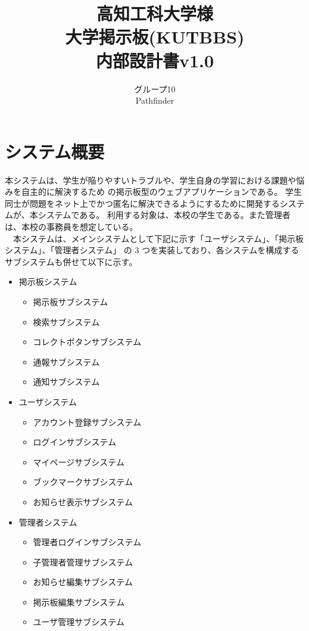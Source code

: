 \documentclass[a4j]{jarticle}
\title{
\vspace{30mm}
{\bf 高知工科大学様}\\
\vspace{5mm}
大学掲示板(KUTBBS)\\
\vspace{5mm}
{\bf  内部設計書v1.0}
\vspace{90mm}
}
\author{
\vspace{5mm}
グループ10 \\
\vspace{5mm}
Pathfinder \\
\vspace{5mm}
\vspace{10mm}
}
\begin{document}
\maketitle
\newpage
\tableofcontents
\newpage


 \section{システム概要}
本システムは、学生が陥りやすいトラブルや、学生自身の学習における課題や悩みを自主的に解決するため の掲示板型のウェブアプリケーションである。 学生同士が問題をネット上でかつ匿名に解決できるようにするために開発するシステムが、本システムである。 利用する対象は、本校の学生である。また管理者は、本校の事務員を想定している。\\
　本システムは、メインシステムとして下記に示す「ユーザシステム」、「掲示板システム」、「管理者システム」 の 3 つを実装しており、各システムを構成するサブシステムも併せて以下に示す。
\begin{itemize}
\item 掲示板システム
	\begin{itemize}
	\item 掲示板サブシステム
	\item 検索サブシステム
	\item コレクトボタンサブシステム
	\item 通報サブシステム
	\item 通知サブシステム
	\end{itemize}
\item ユーザシステム
	\begin{itemize}
	\item アカウント登録サブシステム
	\item ログインサブシステム
	\item マイページサブシステム
	\item ブックマークサブシステム
	\item お知らせ表示サブシステム
	\end{itemize}
\item 管理者システム
	\begin{itemize}
	\item 管理者ログインサブシステム
	\item 子管理者管理サブシステム
	\item お知らせ編集サブシステム
	\item 掲示板編集サブシステム
	\item ユーザ管理サブシステム
	\end{itemize}
\end{itemize}
\end{document}
